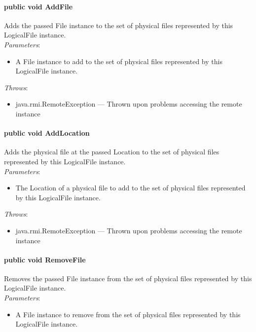 \documentclass[$Date: 2003/06/26 19:29:31 $]{glabarticle}
\begin{document}
\paragraph{public void AddFile}

Adds the passed File instance to the set of physical files represented
by this LogicalFile instance.\\

\textit{Parameters}:
\begin{itemize}
\item[] A File instance to add to the set of physical files represented by this LogicalFile instance.
\end{itemize}

 \textit{Throws}:
 \begin{itemize}
 \item[] java.rmi.RemoteException --- Thrown upon problems accessing the remote instance 
 \end{itemize}

\paragraph{public void AddLocation}

Adds the physical file at the passed Location to the set of physical
files represented by this LogicalFile instance.\\

\textit{Parameters}:
\begin{itemize}
\item[] The Location of a physical file to add to the set of physical files represented by this LogicalFile instance.
\end{itemize}

 \textit{Throws}:
 \begin{itemize}
 \item[] java.rmi.RemoteException --- Thrown upon problems accessing the remote instance 
 \end{itemize}

\paragraph{public void RemoveFile}

Removes the passed File instance from the set of physical files
represented by this LogicalFile instance.\\

\textit{Parameters}:
\begin{itemize}
\item[] A File instance to remove from the set of physical files represented by this LogicalFile instance.
\end{itemize}
\end{document}
